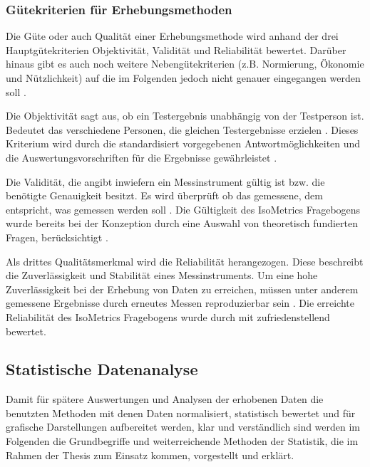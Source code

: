 \subsubsection{Gütekriterien für Erhebungsmethoden}

Die Güte oder auch Qualität einer Erhebungsmethode wird anhand der drei Hauptgütekriterien Objektivität, Validität und Reliabilität bewertet. Darüber hinaus gibt es auch noch weitere Nebengütekriterien (z.B. Normierung, Ökonomie und Nützlichkeit) auf die im Folgenden jedoch nicht genauer eingegangen werden soll \citep[vgl.][Kap. 3.5]{Figl2010}.

Die Objektivität sagt aus, ob ein Testergebnis unabhängig von der Testperson ist. Bedeutet das verschiedene Personen, die gleichen Testergebnisse erzielen \citep[vgl.][Kap. 1]{Himme2007}. Dieses Kriterium wird durch die standardisiert vorgegebenen Antwortmöglichkeiten und die Auswertungsvorschriften für die Ergebnisse gewährleistet \citep[vgl.][Kap. 3.5.1]{Figl2010}.

Die Validität, die angibt inwiefern ein Messinstrument gültig ist bzw. die benötigte Genauigkeit besitzt. Es wird überprüft ob das gemessene, dem entspricht, was gemessen werden soll \citep[vgl][Kap. 1]{Himme2007}. Die Gültigkeit des IsoMetrics Fragebogens wurde bereits bei der Konzeption durch eine Auswahl von theoretisch fundierten Fragen, berücksichtigt \citep[vgl.][Kap. 3.5.2]{Figl2010}.

Als drittes Qualitätsmerkmal wird die Reliabilität herangezogen. Diese beschreibt die Zuverlässigkeit und Stabilität eines Messinstruments. Um eine hohe Zuverlässigkeit bei der Erhebung von Daten zu erreichen, müssen unter anderem gemessene Ergebnisse durch erneutes Messen reproduzierbar sein \citep[vgl.][Kap. 1]{Himme2007}. Die erreichte Reliabilität des IsoMetrics Fragebogens wurde durch \citep[vgl.][2-3]{Gediga1999} mit zufriedenstellend bewertet.

\subsection{Statistische Datenanalyse}
Damit für spätere Auswertungen und Analysen der erhobenen Daten die benutzten Methoden mit denen Daten normalisiert, statistisch bewertet und für grafische Darstellungen aufbereitet werden, klar und verständlich sind werden im Folgenden die Grundbegriffe und weiterreichende Methoden der Statistik, die im Rahmen der Thesis zum Einsatz kommen, vorgestellt und erklärt.

